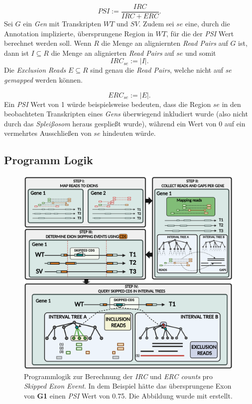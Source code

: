 \documentclass[12pt]{article}
\begin{document}
\[
    PSI := \frac{IRC}{IRC + ERC}
.\]
Sei $G$ ein \textit{Gen}  mit Transkripten $WT$ und $SV$. 
Zudem sei $se$ eine, durch die Annotation implizierte, übersprungene Region in $WT$, 
für die der \textit{PSI} Wert berechnet werden soll.
Wenn $R$ die Menge an aligniernten \textit{Read Pairs} auf $G$ ist,
dann ist $I \subseteq R$ die Menge an alignierten \textit{Read Pairs} auf $se$ und somit 
\[
   IRC_{se} := \left|I\right|
.\]
Die \textit{Exclusion Reads} $E \subseteq R$ sind genau die \textit{Read Pairs},
welche nicht auf $se$ \textit{gemapped}  werden können.

\[
   ERC_{se} := \left|E\right|
.\]
Ein \textit{PSI} Wert von 1 würde beispielsweise bedeuten, dass die Region $se$ in den
beobachteten Transkripten eines \textit{Gens} überwiegend inkludiert wurde
(also nicht durch das \textit{Splei\ss osom} heraus gesplie\ss t wurde), während ein Wert von 0
auf ein vermehrtes Ausschlie\ss en von $se$ hindeuten würde.


\subsection{Programm Logik}
\begin{figure}[htbp]
    \centering
    \includegraphics[width=0.99\textwidth]{./figures/PSI-Mapping.png}
    \caption{Programmlogik zur Berechnung der \textit{IRC} und \textit{ERC counts} pro \textit{Skipped Exon Event}.
    In dem Beispiel hätte das übersprungene Exon von \textbf{G1} einen \textit{PSI} Wert von 0.75.
    Die Abbildung wurde mit \cite{biorender} erstellt.}

    \label{fig:PSI-Mapping-png}
\end{figure}
\end{document}
